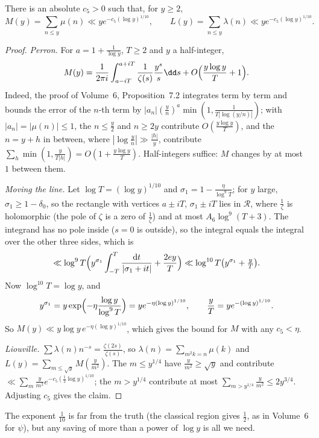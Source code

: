 \begin{proposition}\label{prop:liouville}
There is an absolute $c_5>0$ such that, for $y\ge2$,
\[
M(y)=\sum_{n\le y}\mu(n)\ll ye^{-c_5(\log y)^{1/10}},\qquad L(y)=\sum_{n\le y}\lambda(n)\ll ye^{-c_5(\log y)^{1/10}}.
\]
\end{proposition}
\begin{proof}
\emph{Perron.} For $a=1+\frac1{\log y}$, $T\ge2$ and $y$ a half-integer,
\[
M(y)=\frac1{2\pi i}\int_{a-iT}^{a+iT}\frac1{\zeta(s)}\frac{y^s}s\dd s+O\Bigl(\frac{y\log y}T+1\Bigr).
\]
Indeed, the proof of Volume~6, Proposition~7.2 integrates term by term and bounds the error of the $n$-th term by $|a_n|(\frac yn)^a\min(1,\frac1{T|\log(y/n)|})$; with $|a_n|=|\mu(n)|\le1$, the $n\le\frac y2$ and $n\ge2y$ contribute $O(\frac{y\log y}T)$, and the $n=y+h$ in between, where $|\log\frac yn|\gg\frac{|h|}y$, contribute $\sum_h\min(1,\frac y{T|h|})=O(1+\frac{y\log y}T)$. Half-integers suffice: $M$ changes by at most $1$ between them.

\emph{Moving the line.} Let $\log T=(\log y)^{1/10}$ and $\sigma_1=1-\frac\eta{\log^9T}$; for $y$ large, $\sigma_1\ge1-\delta_0$, so the rectangle with vertices $a\pm iT$, $\sigma_1\pm iT$ lies in $\mathcal R$, where $\frac1\zeta$ is holomorphic (the pole of $\zeta$ is a zero of $\frac1\zeta$) and at most $A_6\log^9(T+3)$. The integrand has no pole inside ($s=0$ is outside), so the integral equals the integral over the other three sides, which is
\[
\ll\log^9T\Bigl(y^{\sigma_1}\int_{-T}^T\frac{\mathrm dt}{|\sigma_1+it|}+\frac{2ey}T\Bigr)\ll\log^{10}T\bigl(y^{\sigma_1}+\tfrac yT\bigr).
\]
Now $\log^{10}T=\log y$, and
\[
y^{\sigma_1}=y\exp\Bigl(-\eta\frac{\log y}{\log^9T}\Bigr)=ye^{-\eta(\log y)^{1/10}},\qquad\frac yT=ye^{-(\log y)^{1/10}}.
\] So $M(y)\ll y\log y\,e^{-\eta(\log y)^{1/10}}$, which gives the bound for $M$ with any $c_5<\eta$.

\emph{Liouville.} $\sum\lambda(n)n^{-s}=\frac{\zeta(2s)}{\zeta(s)}$, so $\lambda(n)=\sum_{m^2k=n}\mu(k)$ and $L(y)=\sum_{m\le\sqrt y}M(\frac y{m^2})$. The $m\le y^{1/4}$ have $\frac y{m^2}\ge\sqrt y$ and contribute $\ll\sum_m\frac y{m^2}e^{-c_5(\frac12\log y)^{1/10}}$; the $m>y^{1/4}$ contribute at most $\sum_{m>y^{1/4}}\frac y{m^2}\le2y^{3/4}$. Adjusting $c_5$ gives the claim.
\end{proof}

The exponent $\frac1{10}$ is far from the truth (the classical region gives $\frac12$, as in Volume~6 for $\psi$), but any saving of more than a power of $\log y$ is all we need.

